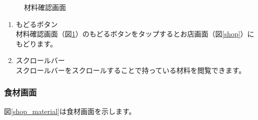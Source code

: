\documentclass[a4j]{jarticle}
\begin{document}
\begin{figure}[H]
    \begin{center}
    \caption {材料確認画面}
    \label{have}
    \end{center}
\end{figure}

\begin{enumerate}
  \renewcommand{\labelenumi}{\textcircled{\scriptsize \theenumi}}
\item もどるボタン\\
  材料確認画面（図\ref{have}）のもどるボタンをタップするとお店画面（図\ref{shop}）にもどります。
\item スクロールバー\\
  スクロールバーをスクロールすることで持っている材料を閲覧できます。
\end{enumerate}

\newpage
\subsubsection{食材画面}
図\ref{shop_material}は食材画面を示します。\\
\end{document}
